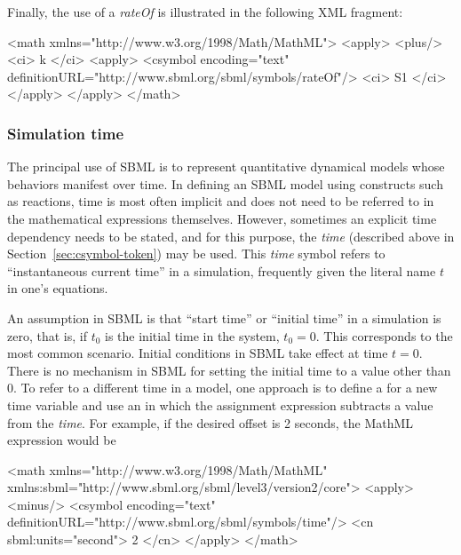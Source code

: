 \begin{blockChanged}
Finally, the use of a \emph{rateOf} is illustrated in the
following XML fragment:

\begin{example}
<math xmlns="http://www.w3.org/1998/Math/MathML">
  <apply>
    <plus/>
    <ci> k </ci>
    <apply>
      <csymbol encoding="text" definitionURL="http://www.sbml.org/sbml/symbols/rateOf"/>
      <ci> S1 </ci>
    </apply>
  </apply>
</math>
\end{example}
\end{blockChanged}

\subsubsection{Simulation time}
\label{sec:meaning-of-time}

The principal use of SBML is to represent quantitative dynamical
models whose behaviors manifest over time.  In defining an
SBML model using constructs such as reactions, time is most often
implicit and does not need to be referred to in the mathematical
expressions themselves.  However, sometimes an explicit time
dependency needs to be stated, and for this purpose, the
\emph{time}  (described above in
Section~\ref{sec:csymbol-token}) may be used.  This \emph{time}
symbol refers to ``instantaneous current time'' in a simulation,
frequently given the literal name $t$ in one's equations.

An assumption in SBML is that ``start time'' or ``initial time''
in a simulation is zero, that is, if $t_0$ is the initial time in
the system, $t_0 = 0$.  This corresponds to the most common
scenario.  Initial conditions in SBML take effect at time $t = 0$.
There is no mechanism in SBML for setting the initial time to a
value other than 0.  To refer to a different time in a model, one
approach is to define a \Parameter for a new time variable and use
an \AssignmentRule in which the assignment expression subtracts a
value from the  \emph{time}.  For example, if the
desired offset is 2 seconds, the MathML expression would be

\begin{example}
<math xmlns="http://www.w3.org/1998/Math/MathML"
      xmlns:sbml="http://www.sbml.org/sbml/level3/version2/core">
    <apply>
        <minus/>
        <csymbol encoding="text" definitionURL="http://www.sbml.org/sbml/symbols/time"/> 
        <cn sbml:units="second"> 2 </cn>
    </apply>
</math>
\end{example}

